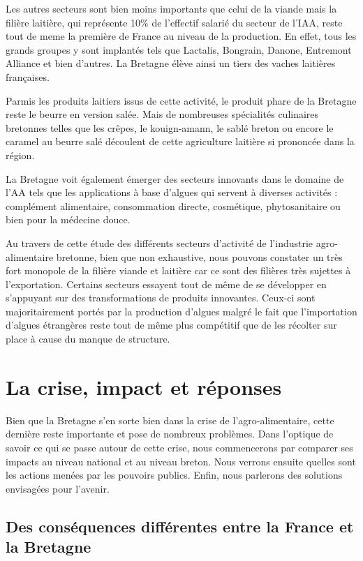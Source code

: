 \documentclass[a4paper,10pt]{report}
\begin{document}
			Les autres secteurs sont bien moins importants que celui de la viande mais la filière laitière, qui représente 10\% de l’effectif salarié du secteur de l’IAA, reste tout de meme la première de France au niveau de la production. En effet, tous les grands groupes y sont implantés tels que Lactalis, Bongrain, Danone, Entremont Alliance et bien d’autres. La Bretagne élève ainsi un tiers des vaches laitières françaises.
			
			Parmis les produits laitiers issus de cette activité, le produit phare de la Bretagne reste le beurre en version salée. Mais de nombreuses spécialités culinaires bretonnes telles que les crêpes, le kouign-amann, le sablé breton ou encore le caramel au beurre salé découlent de cette agriculture laitière si prononcée dans la région.
			
			La Bretagne voit également émerger des secteurs innovants dans le domaine de l’AA tels que les applications à base d’algues qui servent à diverses activités : complément alimentaire, consommation directe, cosmétique, phytosanitaire ou bien pour la médecine douce.
			
			Au travers de cette étude des différents secteurs d’activité de l’industrie agro-alimentaire bretonne, bien que non exhaustive, nous pouvons constater un très fort monopole de la filière viande et laitière car ce sont des filières très sujettes à l’exportation. Certains secteurs essayent tout de même de se développer en s’appuyant sur des transformations de produits innovantes. Ceux-ci sont majoritairement portés par la production d’algues malgré le fait que l’importation d’algues étrangères reste tout de même plus compétitif que de les récolter sur place à cause du manque de structure.
			
			
	\section{La crise, impact et réponses}
		Bien que la Bretagne s’en sorte bien dans la crise de l’agro-alimentaire, cette dernière reste importante et pose de nombreux problèmes. Dans l’optique de savoir ce qui se passe autour de cette crise, nous commencerons par comparer ses impacts au niveau national et au niveau breton. Nous verrons ensuite quelles sont les actions menées par les pouvoirs publics. Enfin, nous parlerons des solutions envisagées pour l’avenir.
		
		\subsection{Des conséquences différentes entre la France et la Bretagne}
\end{document}
